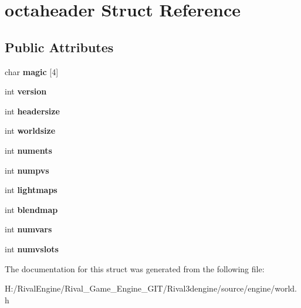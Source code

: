 \hypertarget{structoctaheader}{}\section{octaheader Struct Reference}
\label{structoctaheader}
\subsection*{Public Attributes}
\begin{DoxyCompactItemize}
\item 
\mbox{\label{structoctaheader_a7012e7cb555f8cb20575db295cdebcc4}} 
char {\bfseries magic} \mbox{[}4\mbox{]}
\item 
\mbox{\label{structoctaheader_ac02e9c7bd40c2d522c5f4074ee991d5b}} 
int {\bfseries version}
\item 
\mbox{\label{structoctaheader_af205ea31207feba9f110df8e4623cc67}} 
int {\bfseries headersize}
\item 
\mbox{\label{structoctaheader_a751fbd60bb470681017c13e7511dce21}} 
int {\bfseries worldsize}
\item 
\mbox{\label{structoctaheader_aa3f9cf2528aeb51e77eebe61b5a1bd6e}} 
int {\bfseries numents}
\item 
\mbox{\label{structoctaheader_a585a0e1fcf6987e8a19cf95ec81b763f}} 
int {\bfseries numpvs}
\item 
\mbox{\label{structoctaheader_ab8f3ca6be1e02e1f0a0caebd282fa56b}} 
int {\bfseries lightmaps}
\item 
\mbox{\label{structoctaheader_ae553be2a3f98dfdd6b28071dbbbf2002}} 
int {\bfseries blendmap}
\item 
\mbox{\label{structoctaheader_af29bf1d637640d92dafe7ecc5cd1db15}} 
int {\bfseries numvars}
\item 
\mbox{\label{structoctaheader_ae67b91bd0da69396d12a62e6750135a9}} 
int {\bfseries numvslots}
\end{DoxyCompactItemize}


The documentation for this struct was generated from the following file\+:\begin{DoxyCompactItemize}
\item 
H\+:/\+Rival\+Engine/\+Rival\+\_\+\+Game\+\_\+\+Engine\+\_\+\+G\+I\+T/\+Rival3dengine/source/engine/world.\+h\end{DoxyCompactItemize}
